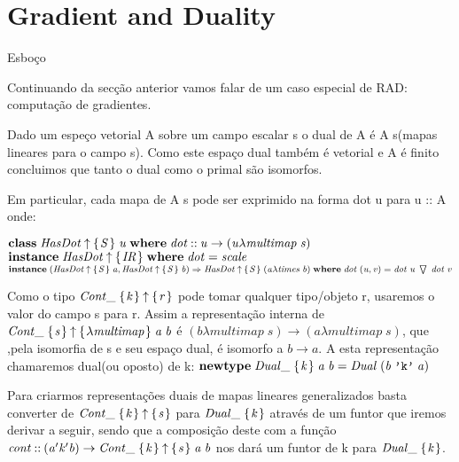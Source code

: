 \documentclass{beamer}
\newcommand{\Conid}[1]{\mathit{#1}}
\newcommand{\Varid}[1]{\mathit{#1}}
\begin{document}
\section{Gradient and Duality}
\begin{frame}{Esboço}

Continuando da secção anterior vamos falar de um caso especial de RAD: computação de gradientes.

Dado um espeço vetorial A sobre um campo escalar s o dual de A é A \multimap s(mapas lineares para o campo s).
Como este espaço dual também é vetorial e A é finito concluimos que tanto o dual como o primal são isomorfos.

Em particular, cada mapa de A \multimap s pode ser exprimido na forma dot u para u :: A onde:

\ensuremath{\mathbf{class}\;\Conid{HasDot}\mathbin{\uparrow}\{\mskip1.5mu \Conid{S}\mskip1.5mu\}\;\Varid{u}\;\mathbf{where}\;\Varid{dot}\mathbin{::}\Varid{u}\rightarrow (\Varid{u}\lambda \Varid{multimap}\;\Varid{s})}
\ensuremath{\mathbf{instance}\;\Conid{HasDot}\mathbin{\uparrow}\{\mskip1.5mu \Conid{IR}\mskip1.5mu\}\;\mathbf{where}\;\Varid{dot}\mathrel{=}\Varid{scale}}
\ensuremath{\mathbf{instance}\;(\Conid{HasDot}\mathbin{\uparrow}\{\mskip1.5mu \Conid{S}\mskip1.5mu\}\;\Varid{a},\Conid{HasDot}\mathbin{\uparrow}\{\mskip1.5mu \Conid{S}\mskip1.5mu\}\;\Varid{b})\Rightarrow\Conid{HasDot}\mathbin{\uparrow}\{\mskip1.5mu \Conid{S}\mskip1.5mu\}\;(\Varid{a}\lambda \Varid{times}\;\Varid{b})\;\mathbf{where}\;\Varid{dot}\;(\Varid{u},\Varid{v})\mathrel{=}\Varid{dot}\;\Varid{u}\; \bigtriangledown \;\Varid{dot}\;\Varid{v}}

Como o tipo \ensuremath{\Conid{Cont\char95 }\;\{\mskip1.5mu \Varid{k}\mskip1.5mu\}\mathbin{\uparrow}\{\mskip1.5mu \Varid{r}\mskip1.5mu\}} pode tomar qualquer tipo/objeto r, usaremos o valor do campo s para r.
Assim a representação interna de \ensuremath{\Conid{Cont\char95 }\;\{\mskip1.5mu \Varid{s}\mskip1.5mu\}\mathbin{\uparrow}\{\mskip1.5mu \lambda \Varid{multimap}\mskip1.5mu\}\;\Varid{a}\;\Varid{b}} é \ensuremath{(\Varid{b}\lambda \Varid{multimap}\;\Varid{s})\rightarrow (\Varid{a}\lambda \Varid{multimap}\;\Varid{s})}, que 
,pela isomorfia de s e seu espaço dual, é isomorfo a \ensuremath{\Varid{b}\rightarrow \Varid{a}}.
A esta representação chamaremos dual(ou oposto) de k:
\ensuremath{\mathbf{newtype}\;\Conid{Dual\char95 }\;\{\mskip1.5mu \Varid{k}\mskip1.5mu\}\;\Varid{a}\;\Varid{b}\mathrel{=}\Conid{Dual}\;(\Varid{b}\;\text{\tt 'k'}\;\Varid{a})}


Para criarmos representações duais de mapas lineares generalizados basta converter de \ensuremath{\Conid{Cont\char95 }\;\{\mskip1.5mu \Varid{k}\mskip1.5mu\}\mathbin{\uparrow}\{\mskip1.5mu \Varid{s}\mskip1.5mu\}} para
\ensuremath{\Conid{Dual\char95 }\;\{\mskip1.5mu \Varid{k}\mskip1.5mu\}} através de um funtor que iremos derivar a seguir, sendo que a composição deste com a função
\ensuremath{\Varid{cont}\mathbin{::}(\Varid{a'k'b})\rightarrow \Conid{Cont\char95 }\;\{\mskip1.5mu \Varid{k}\mskip1.5mu\}\mathbin{\uparrow}\{\mskip1.5mu \Varid{s}\mskip1.5mu\}\;\Varid{a}\;\Varid{b}} nos dará um funtor de k para \ensuremath{\Conid{Dual\char95 }\;\{\mskip1.5mu \Varid{k}\mskip1.5mu\}}.


\end{frame}
\end{document}
